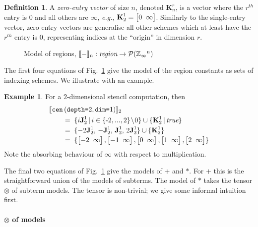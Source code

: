 \documentclass[9pt,preprint]{sigplanconf}
\newcounter{block}
\theoremstyle{definition}
\newtheorem{example}[block]{Example}
\newtheorem{definition}[block]{Definition}
\newcommand{\eg}{\emph{e.g.}}
\newcommand{\interp}[1]{\llbracket{#1}\rrbracket}
\newcommand{\term}[1]{\texttt{#1}}
\newcommand{\stenCenS}[2]{\term{cen} \, (\term{depth=}#1,
  \term{dim=}#2)}
\newcommand{\vtwoh}[2]{\setlength{\arraycolsep}{0em}
\left[\begin{array}{cc}#1 \; & \; #2\end{array}\right]}
\newcommand{\singleEntry}[2]{\textbf{J}_{#2}^{#1}}
\newcommand{\zeroEntry}[2]{\textbf{K}_{#2}^{#1}}
\begin{document}
\begin{definition}A \emph{zero-entry vector} of size $n$, denoted
$\zeroEntry{r}{n}$, is a vector where the $r^{th}$ entry is $0$ and all others
are $\infty$, \eg{}, $\zeroEntry{1}{2} = \vtwoh{0}{\infty}$.
Similarly to the single-entry vector, zero-entry vectors
are generalise all other schemes
which at least have the $r^{th}$ entry is $0$, representing indices at
the ``origin'' in dimension $r$.
\end{definition}

\begin{figure}[t]
\vspace{-0.9em}

\caption{Model of regions,
$\interp{-}_n : \textit{region} \rightarrow \mathcal{P}(\domainVal{}^n)$}
\label{fig:region-model}
\vspace{-1em}
\end{figure}

\noindent
The first four equations of Fig.~\ref{fig:region-model}
give the model of the region constants as sets of indexing
schemes. We illustrate with an example.

\begin{example}
For a $2$-dimensional stencil computation, then
\begin{align*}
& \interp{\stenCenS{2}{1}}_2 \\[-0.1em]
& \qquad = \; \{i\singleEntry{1}{2} \,|\, i \in \{\text{-}2,..., 2\}\!\setminus\!0 \}
  \cup  \{ \zeroEntry{1}{2} \,|\, \textit{true} \} \\[-0.2em]
& \qquad = \; \{-2\singleEntry{1}{2}, \, -\singleEntry{1}{2}, \,
  \singleEntry{1}{2}, \, 2\singleEntry{1}{2}\} \cup
  \{\zeroEntry{1}{2}\} \\[-0.2em]
& \qquad = \; \{\vtwoh{-2}{\infty}, \vtwoh{-1}{\infty}, \vtwoh{0}{\infty},
\vtwoh{1}{\infty}, \vtwoh{2}{\infty}\}
\end{align*}
Note the absorbing behaviour of $\infty$ with respect to
multiplication.
\end{example}
\noindent
The final two equations of Fig.~\ref{fig:region-model} give the
models of $\term{+}$ and $\term{*}$. For $\term{+}$ this is the 
straightforward union of the models of subterms. The model of
$\term{*}$ takes the tensor $\otimes$ of subterm models. The tensor is
non-trivial; we give some informal intuition first. 


\paragraph{$\otimes$ of models}
\end{document}
